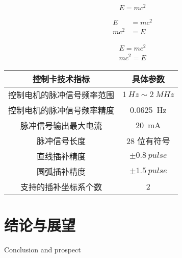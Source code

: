 \documentclass[
  type=master
]{gdutthesis}
\begin{document}
\begin{equation}\label{eq:example}
  E = mc^2
\end{equation}

\begin{align}
  E &= mc^2 \\
  mc^2 &= E
\end{align}

\begin{gather}
  E = mc^2 \\
  mc^2 = E
\end{gather}

\begin{figure}
  \qquad
  \label{fig:example}
\end{figure}

\begin{table}
  \label{tab:example}
  \begin{tabular}{cc}
    \toprule
    控制卡技术指标              & 具体参数                      \\
    \midrule
    控制电机的脉冲信号频率范围  & $\SI{1}{Hz}\sim\SI{2}{MHz}$   \\
    控制电机的脉冲信号频率精度  & \SI{0.0625}{Hz}               \\
    脉冲信号输出最大电流        & \SI{20}{mA}                   \\
    脉冲信号长度                & 28 位有符号                   \\
    直线插补精度                & $\pm \SI{0.8}{pulse}$         \\
    圆弧插补精度                & $\pm \SI{1.5}{pulse}$         \\
    支持的插补坐标系个数        & 2                             \\
    \bottomrule
  \end{tabular}
\end{table}

\gdutbackmatter
\chapter{结论与展望}{Conclusion and prospect}
\zhlipsum[1]
\end{document}
